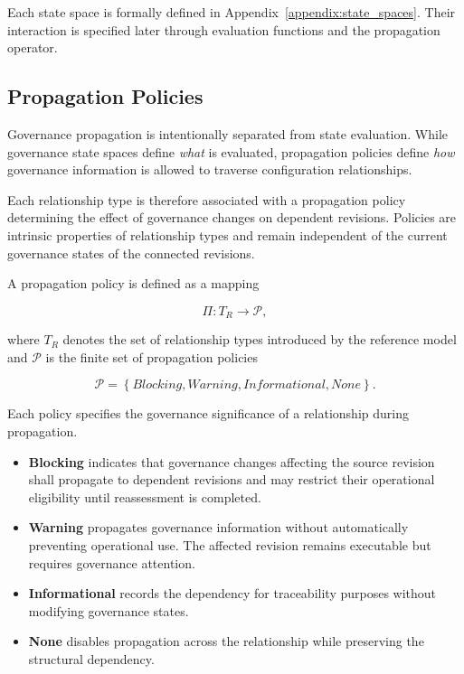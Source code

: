 \documentclass[10pt]{article}
\begin{document}
Each state space is formally defined in Appendix~\ref{appendix:state_spaces}. Their interaction is specified later through evaluation functions and the propagation operator.

\subsection{Propagation Policies}
\label{sec:propagation_policies}

Governance propagation is intentionally separated from state evaluation. While governance state spaces define \emph{what} is evaluated, propagation policies define \emph{how} governance information is allowed to traverse configuration relationships.

Each relationship type is therefore associated with a propagation policy determining the effect of governance changes on dependent revisions. Policies are intrinsic properties of relationship types and remain independent of the current governance states of the connected revisions.

A propagation policy is defined as a mapping

\begin{equation}
	\Pi : T_R \rightarrow \mathcal{P},
	\label{eq:policy_mapping}
\end{equation}

where $T_R$ denotes the set of relationship types introduced by the reference model and $\mathcal{P}$ is the finite set of propagation policies

\begin{equation}
	\mathcal{P}=
	\left\{
	\textit{Blocking},
	\textit{Warning},
	\textit{Informational},
	\textit{None}
	\right\}.
	\label{eq:policy_space}
\end{equation}

Each policy specifies the governance significance of a relationship during propagation.

\begin{itemize}
	\item \textbf{Blocking} indicates that governance changes affecting the source revision shall propagate to dependent revisions and may restrict their operational eligibility until reassessment is completed.
	
	\item \textbf{Warning} propagates governance information without automatically preventing operational use. The affected revision remains executable but requires governance attention.
	
	\item \textbf{Informational} records the dependency for traceability purposes without modifying governance states.
	
	\item \textbf{None} disables propagation across the relationship while preserving the structural dependency.
\end{itemize}
\end{document}
